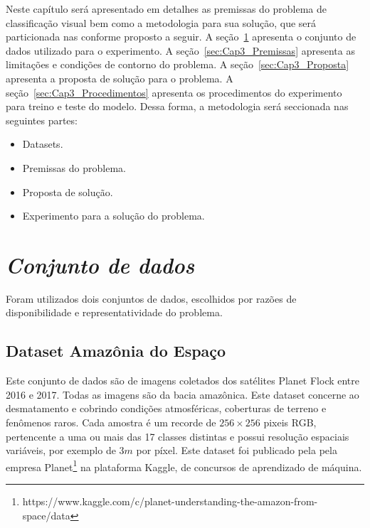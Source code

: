 
Neste capítulo será apresentado em detalhes as premissas do problema de classificação visual bem como a metodologia para sua solução, que será particionada nas conforme proposto a seguir. A seção~\ref{sec:Cap3_Dataset} apresenta o conjunto de dados utilizado para o experimento.  A seção~\ref{sec:Cap3_Premissas} apresenta as limitações e condições de contorno do problema. A seção~\ref{sec:Cap3_Proposta} apresenta a proposta de solução para o problema. A seção~\ref{sec:Cap3_Procedimentos} apresenta os procedimentos do experimento para treino e teste do modelo. Dessa forma, a metodologia será seccionada nas seguintes partes:

\begin{itemize}
    \item  Datasets.
    \item  Premissas do problema.
    \item  Proposta de solução.
    \item  Experimento para a solução do problema.

\end{itemize}


\section{\textit{Conjunto de dados}}\label{sec:Cap3_Dataset}
Foram utilizados dois conjuntos de dados, escolhidos por razões de disponibilidade e representatividade do problema. 


\subsection{Dataset Amazônia do Espaço}\label{sec:Cap3_Amazon_dataset}

Este conjunto de dados são de imagens coletados dos satélites Planet Flock entre 2016 e 2017. Todas as imagens são da bacia amazônica. Este dataset concerne ao desmatamento e cobrindo condições atmosféricas, coberturas de terreno e fenômenos raros. Cada amostra é um recorde de $256 \times 256$ pixeis RGB, pertencente a uma ou mais das 17 classes distintas e possui resolução espaciais variáveis, por exemplo de $3 m$ por píxel. Este dataset foi publicado pela pela empresa Planet\footnote{https://www.kaggle.com/c/planet-understanding-the-amazon-from-space/data} na plataforma Kaggle, de concursos de aprendizado de máquina.

